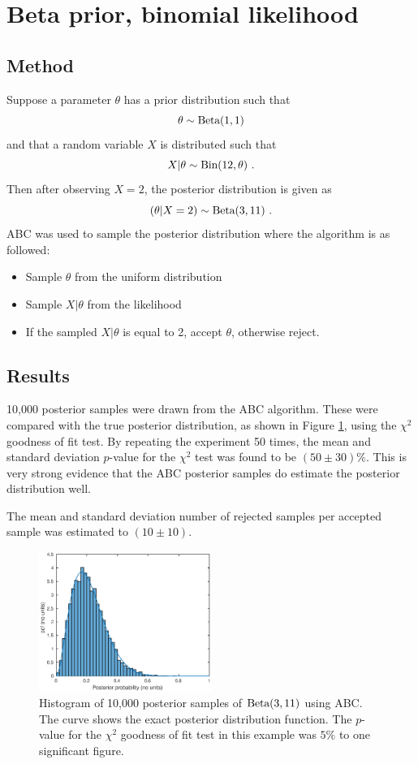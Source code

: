 \documentclass[a4paper]{proc}
\begin{document}
\section{Beta prior, binomial likelihood}
\subsection{Method}
Suppose a parameter $\theta$ has a prior distribution such that
\begin{equation}
\theta\sim\textup{Beta}(1,1)
\end{equation}
and that a random variable $X$ is distributed such that
\begin{equation}
X|\theta\sim\textup{Bin}(12,\theta) \ .
\end{equation}
Then after observing $X=2$, the posterior distribution is given as
\begin{equation}
(\theta|X=2)\sim\textup{Beta}(3,11) \ .
\end{equation}
ABC was used to sample the posterior distribution where the algorithm is as followed:
\begin{itemize}
  \item Sample $\theta$ from the uniform distribution
  \item Sample $X|\theta$ from the likelihood
  \item If the sampled $X|\theta$ is equal to 2, accept $\theta$, otherwise reject.
\end{itemize}

\subsection{Results}
10,000 posterior samples were drawn from the ABC algorithm. These were compared with the true posterior distribution, as shown in Figure \ref{binomial}, using the $\chi^2$ goodness of fit test.  By repeating the experiment 50 times, the mean and standard deviation $p$-value for the $\chi^2$ test was found to be $(50\pm30)\%$. This is very strong evidence that the ABC posterior samples do estimate the posterior distribution well.

The mean and standard deviation number of rejected samples per accepted sample was estimated to $(10\pm10)$.

\begin{figure}
\includegraphics[width=0.5\textwidth]{binomial_ABC0528.eps}
\caption{Histogram of 10,000 posterior samples of $\textup{Beta}(3,11)$ using ABC. The curve shows the exact posterior distribution function. The $p$-value for the $\chi^2$ goodness of fit test in this example was $5\%$ to one significant figure.}
\label{binomial}
\end{figure}
\end{document}
